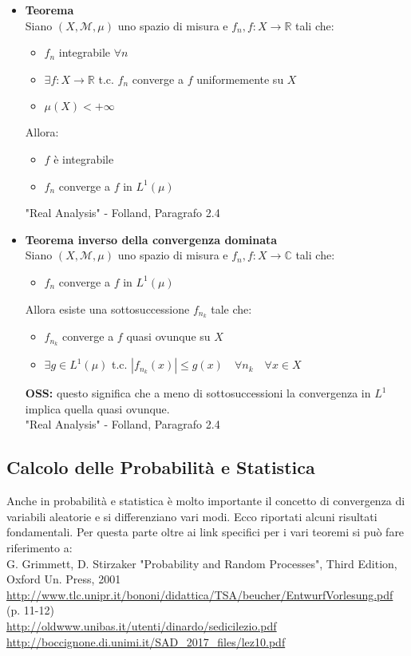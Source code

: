 \documentclass[12pt,a4paper]{report}
\begin{document}
\begin{itemize}
\newpage
\item \textbf{Teorema}\\
Siano \( \left(X, \mathcal{M}, \mu\right) \) uno spazio di misura e \(f_{n}, f : X \rightarrow \mathbb{R}\) tali che:
\begin{itemize}
\item \(f_{n}\) integrabile \( \forall n\)
\item \( \exists f : X \rightarrow \mathbb{R}\) t.c. \(f_{n}\) converge a \(f\) uniformemente su \(X\)
\item \(\mu(X) < +\infty\)
\end{itemize}
Allora:
\begin{itemize}
\item \(f\) è integrabile
\item \(f_{n}\) converge a \(f\) in \(L^1(\mu)\)
\end{itemize}
"Real Analysis" - Folland, Paragrafo 2.4


\item \textbf{Teorema inverso della convergenza dominata}\\
Siano \( \left(X, \mathcal{M}, \mu\right) \) uno spazio di misura e \(f_{n}, f : X \rightarrow \mathbb{C}\) tali che:
\begin{itemize}
\item \(f_{n}\) converge a \(f\) in \(L^1(\mu)\)
\end{itemize}
Allora esiste una sottosuccessione \(f_{n_{k}}\) tale che:
\begin{itemize}
\item \(f_{n_{k}}\) converge a \(f\) quasi ovunque su \(X\)
\item \(\exists g\in L^{1}(\mu)\) \quad t.c. \( |f_{n_{k}}(x)|\leq g(x) \quad \forall n_{k} \quad \forall x \in X\)
\end{itemize}
\textbf{OSS:} questo significa che a meno di sottosuccessioni la convergenza in \(L^1\) implica quella quasi ovunque.\\
\newline
"Real Analysis" - Folland, Paragrafo 2.4

\end{itemize}
\newpage

\subsection*{Calcolo delle Probabilità e Statistica}
Anche in probabilità e statistica è molto importante il concetto di convergenza di variabili aleatorie e si differenziano vari modi. Ecco riportati alcuni risultati fondamentali. Per questa parte oltre ai link specifici per i vari teoremi si può fare riferimento a:\\
G. Grimmett, D. Stirzaker "Probability and Random Processes", Third Edition, Oxford Un. Press, 2001\\
\url{http://www.tlc.unipr.it/bononi/didattica/TSA/beucher/EntwurfVorlesung.pdf} (p. 11-12)\\
\url{http://oldwww.unibas.it/utenti/dinardo/sedicilezio.pdf}\\
\url{http://boccignone.di.unimi.it/SAD_2017_files/lez10.pdf}
\end{document}
